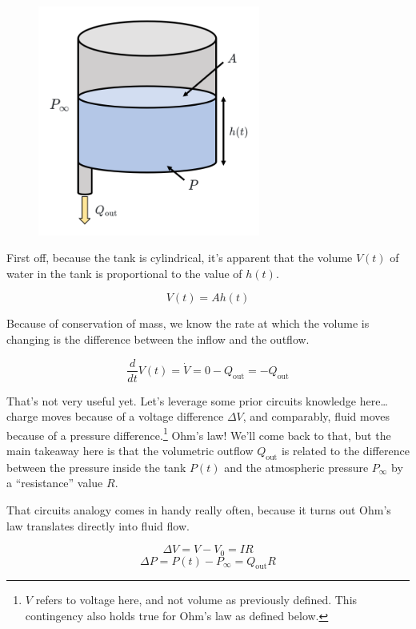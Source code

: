 \documentclass[
  letterpaper,
  DIV=11,
  numbers=noendperiod]{scrreprt}
\begin{document}
\begin{figure}

{\centering \includegraphics[width=0.65\textwidth,height=\textheight]{figs/2_tank.png}

}

\end{figure}

First off, because the tank is cylindrical, it's apparent that the
volume \(V(t)\) of water in the tank is proportional to the value of
\(h(t)\).

\[V(t) = A h(t)\]

Because of conservation of mass, we know the rate at which the volume is
changing is the difference between the inflow and the outflow.

\[\frac{d}{dt} V(t) = \dot{V} = 0 -Q_\text{out} = -Q_\text{out} \tag{1}\]

That's not very useful yet. Let's leverage some prior circuits knowledge
here\ldots charge moves because of a voltage difference \(\Delta V\),
and comparably, fluid moves because of a pressure difference.\footnote{\(V\)
  refers to voltage here, and not volume as previously defined. This
  contingency also holds true for Ohm's law as defined below.} Ohm's
law! We'll come back to that, but the main takeaway here is that the
volumetric outflow \(Q_\text{out}\) is related to the difference between
the pressure inside the tank \(P(t)\) and the atmospheric pressure
\(P_\infty\) by a ``resistance'' value \(R\).

That circuits analogy comes in handy really often, because it turns out
Ohm's law translates directly into fluid flow.

\[\Delta V = V - V_0 = IR\]
\[\Delta P = P(t) - P_\infty = Q_\text{out} R \tag{2}\]
\end{document}
